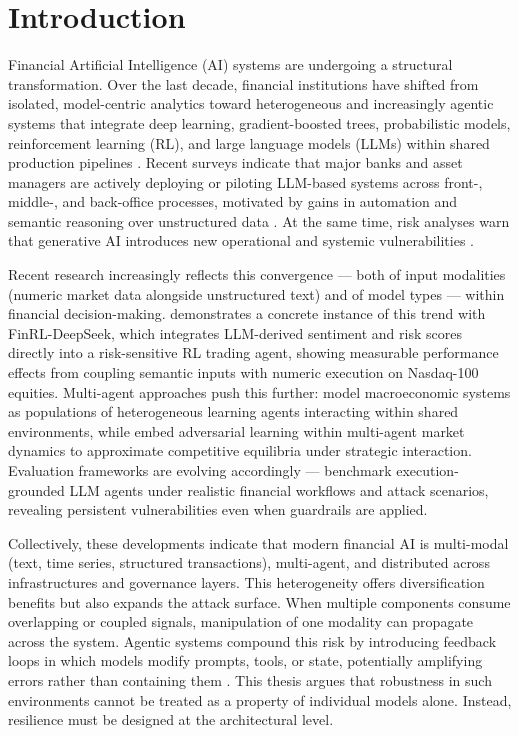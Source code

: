 \chapter{Introduction} \label{cha:introduction}
\pagestyle{plain}

Financial Artificial Intelligence (AI) systems are undergoing a structural transformation. Over the last decade, financial institutions have shifted from isolated, model-centric analytics toward heterogeneous and increasingly agentic systems that integrate deep learning, gradient-boosted trees, probabilistic models, reinforcement learning (RL), and large language models (LLMs) within shared production pipelines \cite{saha2025genai}. Recent surveys indicate that major banks and asset managers are actively deploying or piloting LLM-based systems across front-, middle-, and back-office processes, motivated by gains in automation and semantic reasoning over unstructured data \cite{saha2025genai, nie_survey_2024}. At the same time, risk analyses warn that generative AI introduces new operational and systemic vulnerabilities \cite{gehrmann2025risks}.

Recent research increasingly reflects this convergence — both of input modalities (numeric market data alongside unstructured text) and of model types — within financial decision-making. \cite{benhenda2025finrl} demonstrates a concrete instance of this trend with FinRL-DeepSeek, which integrates LLM-derived sentiment and risk scores directly into a risk-sensitive RL trading agent, showing measurable performance effects from coupling semantic inputs with numeric execution on Nasdaq-100 equities. Multi-agent approaches push this further: \cite{dwarakanath_abides-economist_2025} model macroeconomic systems as populations of heterogeneous learning agents interacting within shared environments, while \cite{kratsios_generative_2025} embed adversarial learning within multi-agent market dynamics to approximate competitive equilibria under strategic interaction. Evaluation frameworks are evolving accordingly — \cite{yang_finvault_2026} benchmark execution-grounded LLM agents under realistic financial workflows and attack scenarios, revealing persistent vulnerabilities even when guardrails are applied.

Collectively, these developments indicate that modern financial AI is multi-modal (text, time series, structured transactions), multi-agent, and distributed across infrastructures and governance layers. This heterogeneity offers diversification benefits but also expands the attack surface. When multiple components consume overlapping or coupled signals, manipulation of one modality can propagate across the system. Agentic systems compound this risk by introducing feedback loops in which models modify prompts, tools, or state, potentially amplifying errors rather than containing them \cite{kurshan_agentic_2025, yang_finvault_2026}. This thesis argues that robustness in such environments cannot be treated as a property of individual models alone. Instead, resilience must be designed at the architectural level.


